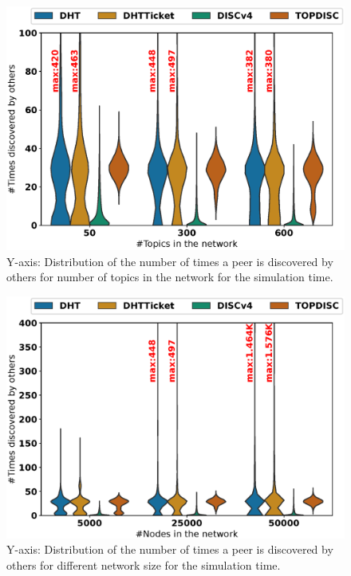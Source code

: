 \begin{figure}
\includegraphics[width=\linewidth]{results/efficiency/violin_topic_wasDiscovered.eps}
\caption{Y-axis: Distribution of the number of times a peer is discovered by others for number of topics in the network for the simulation time.}
\label{fig:discoveredByPerTopic}
\end{figure}

\begin{figure}[!h]
\includegraphics[width=\linewidth]{results/efficiency/violin_size_wasDiscovered.eps}
\caption{Y-axis: Distribution of the number of times a peer is discovered by others for different network size for the simulation time.}
\label{fig:efficiency_size}
\end{figure}

